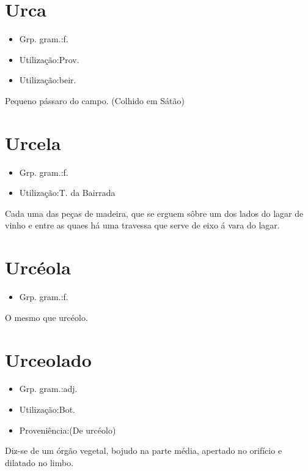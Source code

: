 \documentclass{article}
\begin{document}
\section{Urca}
\begin{itemize}
\item {Grp. gram.:f.}
\end{itemize}
\begin{itemize}
\item {Utilização:Prov.}
\end{itemize}
\begin{itemize}
\item {Utilização:beir.}
\end{itemize}
Pequeno pássaro do campo. (Colhido em Sátão)
\section{Urcela}
\begin{itemize}
\item {Grp. gram.:f.}
\end{itemize}
\begin{itemize}
\item {Utilização:T. da Bairrada}
\end{itemize}
Cada uma das peças de madeira, que se erguem sôbre um dos lados do lagar de vinho e entre as quaes há uma travessa que serve de eixo á vara do lagar.
\section{Urcéola}
\begin{itemize}
\item {Grp. gram.:f.}
\end{itemize}
O mesmo que \textunderscore urcéolo\textunderscore .
\section{Urceolado}
\begin{itemize}
\item {Grp. gram.:adj.}
\end{itemize}
\begin{itemize}
\item {Utilização:Bot.}
\end{itemize}
\begin{itemize}
\item {Proveniência:(De \textunderscore urcéolo\textunderscore )}
\end{itemize}
Diz-se de um órgão vegetal, bojudo na parte média, apertado no orifício e dilatado no limbo.
\end{document}
